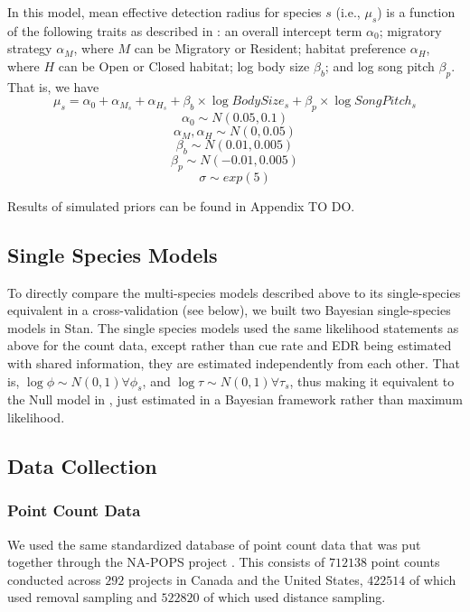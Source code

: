 \documentclass[12pt]{article}
\begin{document}
\par In this model, mean effective detection radius for species $s$ (i.e., $\mu_s$) is a function of the following traits as described in \cite{solymos_phylogeny_2018}: an overall intercept term $\alpha_0$; migratory strategy $\alpha_M$, where $M$ can be Migratory or Resident; habitat preference $\alpha_H$, where $H$ can be Open or Closed habitat; log body size $\beta_b$; and log song pitch $\beta_p$. 
That is, we have
$$ \mu_s = \alpha_0 + \alpha_{M_s} + \alpha_{H_s} + \beta_b \times \log BodySize_s + \beta_p \times \log SongPitch_s$$
$$\alpha_0 \sim N(0.05, 0.1)$$
$$ \alpha_M, \alpha_H \sim N(0, 0.05)$$
$$ \beta_b \sim N(0.01, 0.005)$$
$$ \beta_p \sim N(-0.01, 0.005) $$
$$\sigma \sim exp(5)$$

\par Results of simulated priors can be found in Appendix TO DO.

\subsection{Single Species Models}

\par To directly compare the multi-species models described above to its single-species equivalent in a cross-validation (see below), we built two Bayesian single-species models in Stan.
The single species models used the same likelihood statements as above for the count data, except rather than cue rate and EDR being estimated with shared information, they are estimated independently from each other.
That is, $\log \phi \sim N(0,1) \forall \phi_{s}$, and $\log \tau \sim N(0,1) \forall \tau_s$, thus making it equivalent to the Null model in \citet{edwards_point_2023}, just estimated in a Bayesian framework rather than maximum likelihood. 

\subsection{Data Collection}
\subsubsection{Point Count Data}
\par We used the same standardized database of point count data that was put together through the NA-POPS project \cite{edwards_point_2023}. 
This consists of $712138$ point counts conducted across $292$ projects in Canada and the United States, $422514$ of which used removal sampling and $522820$ of which used distance sampling.
\end{document}
